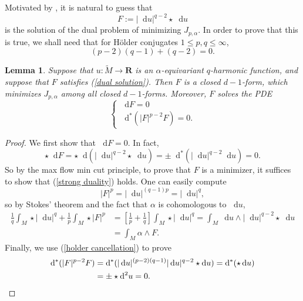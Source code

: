 \documentclass[reqno,11pt]{amsart}
\newcommand{\RR}{\mathbf{R}}
\newcommand*\dif{\mathop{}\!\mathrm{d}}
\newtheorem{lemma}[theorem]{Lemma}
\theoremstyle{definition}
\numberwithin{equation}{section}
\begin{document}
Motivated by \cite[\S3.1]{daskalopoulos2020transverse}, it is natural to guess that 
\begin{equation}\label{dual solution}
F := |\dif u|^{q - 2} \star \dif u
\end{equation}
is the solution of the dual problem of minimizing $J_{p, \alpha}$.
In order to prove that this is true, we shall need that for H\"older conjugates $1 \leq p, q \leq \infty$,
\begin{equation}\label{holder cancellation}
	(p - 2)(q - 1) + (q - 2) = 0.
\end{equation}

\begin{lemma}
Suppose that $u: \tilde M \to \RR$ is an $\alpha$-equivariant $q$-harmonic function, and suppose that $F$ satisfies (\ref{dual solution}).
Then $F$ is a closed $d - 1$-form, which minimizes $J_{p, \alpha}$ among all closed $d - 1$-forms.
Moreover, $F$ solves the PDE 
\begin{equation}\label{pMaxwell}
\begin{cases}
	\dif F = 0 \\
	\dif^* (|F|^{p - 2} F) = 0.
\end{cases}
\end{equation}
\end{lemma}
\begin{proof}
We first show that $\dif F = 0$.
In fact, 
$$\star \dif F = \star \dif(|\dif u|^{q - 2} \star \dif u) = \pm \dif^*(|\dif u|^{q - 2} \dif u) = 0.$$
So by the max flow min cut principle, to prove that $F$ is a minimizer, it suffices to show that (\ref{strong duality}) holds.
One can easily compute 
$$|F|^p = |\dif u|^{(q - 1)p} = |\dif u|^q,$$
so by Stokes' theorem and the fact that $\alpha$ is cohomologous to $\dif u$,
\begin{align*}
\frac{1}{q} \int_M \star |\dif u|^q + \frac{1}{p} \int_M \star |F|^p&
= \left[\frac{1}{p} + \frac{1}{q}\right] \int_M \star |\dif u|^q
= \int_M \dif u \wedge |\dif u|^{q - 2} \star \dif u \\
&= \int_M \alpha \wedge F.
\end{align*}
Finally, we use (\ref{holder cancellation}) to prove
\begin{align*}
\dif^*(|F|^{p - 2} F) &= \dif^*(|\dif u|^{(p - 2)(q - 1)} |\dif u|^{q - 2} \star \dif u) = \dif^*(\star \dif u) \\
&= \pm \star \dif^2 u = 0. \qedhere 
\end{align*}
\end{proof}
\end{document}
